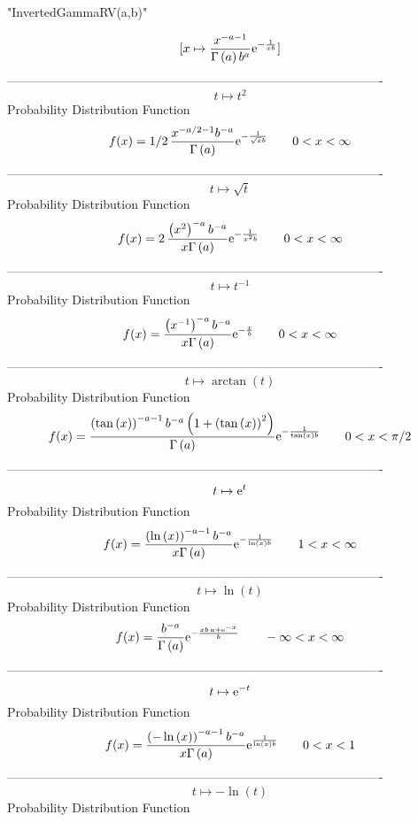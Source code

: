 \documentclass[12pt]{article}
\begin{document}
 
                           "InvertedGammaRV(a,b)"

$$[x\mapsto {\frac {{x}^{-a-1}}{\Gamma \left( a \right) {b}^{a}}{{\rm e}
^{-{\frac {1}{xb}}}}}]
$$-------------------------------------------------------------------------------------------  \\$$t\mapsto {t}^{2}
$$Probability Distribution Function 
$$  f(x)=1/2\,{\frac {{x}^{-a/2-1}{b}^{-a}}{\Gamma \left( a \right) }{{\rm e}^{
-{\frac {1}{\sqrt {x}b}}}}}
 \qquad0
 < x < \infty 
$$-------------------------------------------------------------------------------------------  \\$$t\mapsto \sqrt {t}
$$Probability Distribution Function 
$$  f(x)=2\,{\frac { \left( {x}^{2} \right) ^{-a}{b}^{-a}}{x\Gamma \left( a
 \right) }{{\rm e}^{-{\frac {1}{{x}^{2}b}}}}}
 \qquad0
 < x < \infty 
$$-------------------------------------------------------------------------------------------  \\$$t\mapsto {t}^{-1}
$$Probability Distribution Function 
$$  f(x)={\frac { \left( {x}^{-1} \right) ^{-a}{b}^{-a}}{x\Gamma \left( a
 \right) }{{\rm e}^{-{\frac {x}{b}}}}}
 \qquad0
 < x < \infty 
$$-------------------------------------------------------------------------------------------  \\$$t\mapsto \arctan \left( t \right) 
$$Probability Distribution Function 
$$  f(x)={\frac { \left( \tan \left( x \right)  \right) ^{-a-1}{b}^{-a} \left( 
1+ \left( \tan \left( x \right)  \right) ^{2} \right) }{\Gamma \left( 
a \right) }{{\rm e}^{-{\frac {1}{\tan \left( x \right) b}}}}}
 \qquad0
 < x < \pi/2
$$-------------------------------------------------------------------------------------------  \\$$t\mapsto {{\rm e}^{t}}
$$Probability Distribution Function 
$$  f(x)={\frac { \left( \ln  \left( x \right)  \right) ^{-a-1}{b}^{-a}}{x
\Gamma \left( a \right) }{{\rm e}^{-{\frac {1}{\ln  \left( x \right) b
}}}}}
 \qquad1
 < x < \infty 
$$-------------------------------------------------------------------------------------------  \\$$t\mapsto \ln  \left( t \right) 
$$Probability Distribution Function 
$$  f(x)={\frac {{b}^{-a}}{\Gamma \left( a \right) }{{\rm e}^{-{\frac {xb\,a+{
{\rm e}^{-x}}}{b}}}}}
 \qquad-\infty 
 < x < \infty 
$$-------------------------------------------------------------------------------------------  \\$$t\mapsto {{\rm e}^{-t}}
$$Probability Distribution Function 
$$  f(x)={\frac { \left( -\ln  \left( x \right)  \right) ^{-a-1}{b}^{-a}}{x
\Gamma \left( a \right) }{{\rm e}^{{\frac {1}{\ln  \left( x \right) b}
}}}}
 \qquad0
 < x < 1
$$-------------------------------------------------------------------------------------------  \\$$t\mapsto -\ln  \left( t \right) 
$$Probability Distribution Function 
\end{document}
